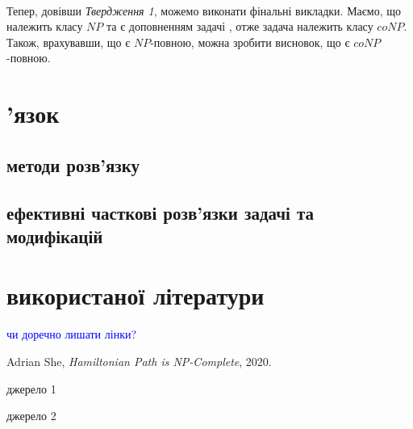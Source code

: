 \documentclass[14pt]{article}
\begin{document}
\begin{spacing}{1.175}
    \\
    \quad Тепер, довівши \textit{Твердження 1}, можемо виконати фінальні викладки. Маємо, що \hamcycle належить класу \(NP\) та \nonhamcycle є доповненням задачі \hamcycle, отже задача \nonhamcycle належить класу \(coNP\). Також, врахувавши, що \hamcycle є \(NP\)-повною, можна зробити висновок, що \nonhamcycle є  \(coNP\)-повною.
        

    \section{'язок}
        \subsection{ методи розв'язку}
        \subsection{ ефективні часткові розв'язки задачі та модифікацій}

    \section{ використаної літератури}
    \textcolor{blue}{чи доречно лишати лінки?}
    \begin{thebibliography}{9}
        \item Adrian She, \emph{Hamiltonian Path is NP-Complete}, 2020.
        \item джерело 1 
        \item джерело 2
    \end{thebibliography}


    
	\end{spacing}
\end{document}
